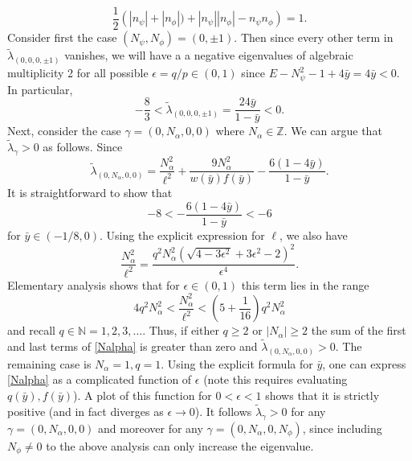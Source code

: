 \documentclass[11pt]{amsart}
\theoremstyle{plain}
\theoremstyle{definition}
\numberwithin{equation}{section}
\begin{document}
\begin{equation}
     \frac{1}{2}\left(|n_\psi| + |n_\phi|) + |n_\psi| |n_\phi| - n_\psi n_\phi \right) = 1.
\end{equation} 
Consider first the case $(N_\psi,N_\phi) = (0,\pm 1)$. Then since every other term in $\tilde\lambda_{(0,0,0,\pm 1)}$ vanishes, we will have a a negative eigenvalues of algebraic multiplicity 2 for all possible $\epsilon = q/p \in (0,1)$ since $E - N_\psi^2 - 1 + 4\bar{y}= 4\bar{y} < 0$. In particular, 
\begin{equation}
   -\frac{8}{3} <  \tilde\lambda_{(0,0,0,\pm 1)} = \frac{24 \bar{y}}{1 - \bar{y}} < 0.
\end{equation}
Next, consider the case $\gamma = (0,N_\alpha,0,0)$ where $N_\alpha \in \mathbb{Z}$. We can argue that $\tilde\lambda_\gamma > 0$ as follows. Since 
\begin{equation}\label{Nalpha}
       \tilde{\lambda}_{(0,N_\alpha,0,0)} = \frac{N_\alpha^2}{\ell^2} + \frac{9 N_\alpha^2}{w(\bar{y})f(\bar{y})} - \frac{6(1 - 4\bar{y})}{1-\bar{y}} .
\end{equation} It is straightforward to show that 
\begin{equation}
   -8< - \frac{6(1 - 4\bar{y})}{1-\bar{y}} < -6
\end{equation} for $\bar{y} \in (-1/8,0)$. Using the explicit expression for $\ell$, we also have
\begin{equation}
    \frac{N_\alpha^2}{\ell^2} = \frac{q^2N_\alpha^2 (\sqrt{4 - 3\epsilon^2} + 3\epsilon^2 -2)^2}{\epsilon^4}.
\end{equation} Elementary analysis shows that for $\epsilon\in(0,1)$ this term lies in the range
\begin{equation}
4 q^2 N_\alpha^2 <  \frac{N_\alpha^2}{\ell^2} < \left(5 + \frac{1}{16}\right) q^2 N_\alpha^2
\end{equation} and recall $q \in \mathbb{N} = 1,2,3,\ldots$. Thus, if either $q \geq 2$ or $|N_\alpha| \geq 2$ the sum of the first and last terms of \eqref{Nalpha} is greater than zero and $\tilde\lambda_{(0,N_\alpha,0,0)} >0$. The remaining case is $N_\alpha =1, q = 1$. Using the explicit formula for $\bar{y}$, one can express \eqref{Nalpha} as a complicated function of $\epsilon$ (note this requires evaluating $q(\bar{y}), f(\bar{y})$). A plot of this function for $0 < \epsilon < 1$ shows that it is strictly positive (and in fact diverges as $\epsilon \to 0$). It follows $\tilde\lambda_\gamma >0$ for any $\gamma = (0,N_\alpha,0,0)$ and moreover for any $\gamma = (0,N_\alpha,0,N_\phi)$, since including $N_\phi \neq 0$ to the above analysis can only increase the eigenvalue. 
\end{document}
